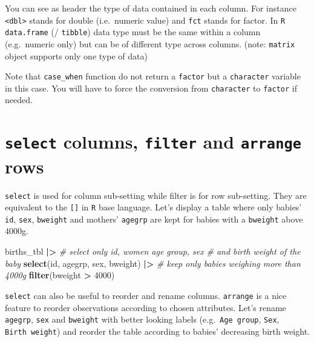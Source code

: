 \documentclass[
]{book}
\newenvironment{Shaded}{\begin{snugshade}}{\end{snugshade}}
\newcommand{\CommentTok}[1]{\textcolor[rgb]{0.56,0.35,0.01}{\textit{#1}}}
\newcommand{\DecValTok}[1]{\textcolor[rgb]{0.00,0.00,0.81}{#1}}
\newcommand{\FunctionTok}[1]{\textcolor[rgb]{0.13,0.29,0.53}{\textbf{#1}}}
\newcommand{\NormalTok}[1]{#1}
\newcommand{\SpecialCharTok}[1]{\textcolor[rgb]{0.81,0.36,0.00}{\textbf{#1}}}
\begin{document}
You can see as header the type of data contained in each column.
For instance \texttt{\textless{}dbl\textgreater{}} stands for double (i.e.~numeric value) and \texttt{fct}
stands for factor.
In \texttt{R} \texttt{data.frame} (/ \texttt{tibble}) data type
must be the same within a column (e.g.~numeric only) but can be of different type across columns. (note: \texttt{matrix} object supports only one type of data)

Note that \texttt{case\_when} function do not return a \texttt{factor} but a \texttt{character} variable in this case.
You will have to force the conversion from \texttt{character} to \texttt{factor} if needed.

\section{\texorpdfstring{\texttt{select} columns, \texttt{filter} and \texttt{arrange} rows}{select columns, filter and arrange rows}}\label{select-columns-filter-and-arrange-rows}

\texttt{select} is used for column sub-setting while filter is for row sub-setting.
They are equivalent to the \texttt{{[}{]}} in \texttt{R} base language.
Let's display a table where only babies' \texttt{id}, \texttt{sex}, \texttt{bweight} and mothers'
\texttt{agegrp} are kept for babies with a \texttt{bweight} above 4000g.

\begin{Shaded}
\begin{Highlighting}[]
\NormalTok{births\_tbl }\SpecialCharTok{|\textgreater{}}
  \CommentTok{\# select only id, women age group, sex }
  \CommentTok{\# and birth weight of the baby}
  \FunctionTok{select}\NormalTok{(id, agegrp, sex, bweight) }\SpecialCharTok{|\textgreater{}}
  \CommentTok{\# keep only babies weighing more than 4000g}
  \FunctionTok{filter}\NormalTok{(bweight }\SpecialCharTok{\textgreater{}} \DecValTok{4000}\NormalTok{)}
\end{Highlighting}
\end{Shaded}

\texttt{select} can also be useful to reorder and rename columns.
\texttt{arrange} is a nice feature to reorder observations according to chosen attributes.
Let's rename \texttt{agegrp}, \texttt{sex} and \texttt{bweight} with better looking labels (e.g.~\texttt{Age\ group}, \texttt{Sex}, \texttt{Birth\ weight}) and reorder the table according to babies' decreasing birth weight.
\end{document}
